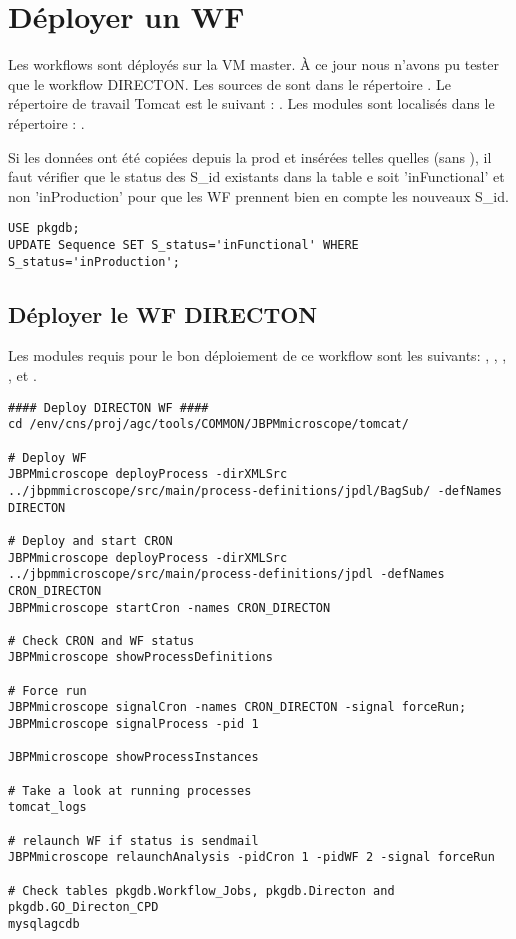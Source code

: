 \section{Déployer un WF} \label{sec:deployer_wf}

Les workflows sont déployés sur la VM master.
À ce jour nous n'avons pu tester que le workflow DIRECTON.
Les sources de  sont dans le répertoire .
Le répertoire de travail Tomcat est le suivant : .
Les modules sont localisés dans le répertoire : .

\begin{mycolorbox}
    Si les données ont été copiées depuis la prod et insérées telles quelles (sans ), il faut vérifier que le status des S\_id existants dans la table e soit 'inFunctional' et non 'inProduction' pour que les WF prennent bien en compte les nouveaux S\_id.
\end{mycolorbox}

\begin{lstlisting}[style=SQL]
USE pkgdb;
UPDATE Sequence SET S_status='inFunctional' WHERE S_status='inProduction';
\end{lstlisting}

\subsection{Déployer le WF DIRECTON}

Les modules requis pour le bon déploiement de ce workflow sont les suivants: , , , ,  et .

\begin{lstlisting}[style=bash]
#### Deploy DIRECTON WF ####
cd /env/cns/proj/agc/tools/COMMON/JBPMmicroscope/tomcat/

# Deploy WF
JBPMmicroscope deployProcess -dirXMLSrc ../jbpmmicroscope/src/main/process-definitions/jpdl/BagSub/ -defNames DIRECTON

# Deploy and start CRON
JBPMmicroscope deployProcess -dirXMLSrc ../jbpmmicroscope/src/main/process-definitions/jpdl -defNames CRON_DIRECTON
JBPMmicroscope startCron -names CRON_DIRECTON

# Check CRON and WF status
JBPMmicroscope showProcessDefinitions

# Force run
JBPMmicroscope signalCron -names CRON_DIRECTON -signal forceRun; JBPMmicroscope signalProcess -pid 1

JBPMmicroscope showProcessInstances

# Take a look at running processes
tomcat_logs

# relaunch WF if status is sendmail
JBPMmicroscope relaunchAnalysis -pidCron 1 -pidWF 2 -signal forceRun

# Check tables pkgdb.Workflow_Jobs, pkgdb.Directon and pkgdb.GO_Directon_CPD
mysqlagcdb
\end{lstlisting}
